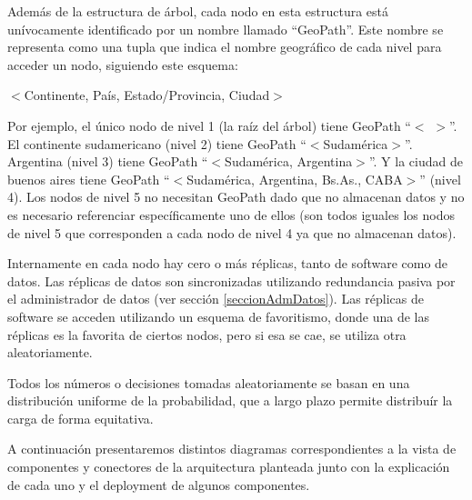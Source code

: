 Además de la estructura de árbol, cada nodo en esta estructura está unívocamente identificado por un nombre llamado ``GeoPath''. Este nombre se representa como una tupla que indica el nombre geográfico de cada nivel para acceder un nodo, siguiendo este esquema:
\begin{center}
	$<$Continente, País, Estado/Provincia, Ciudad$>$
\end{center}

Por ejemplo, el único nodo de nivel 1 (la raíz del árbol) tiene GeoPath ``$<$ $>$''. El continente sudamericano (nivel 2) tiene GeoPath ``$<$Sudamérica$>$''. Argentina (nivel 3) tiene GeoPath ``$<$Sudamérica, Argentina$>$''. Y la ciudad de buenos aires tiene GeoPath ``$<$Sudamérica, Argentina, Bs.As., CABA$>$'' (nivel 4). Los nodos de nivel 5 no necesitan GeoPath dado que no almacenan datos y no es necesario referenciar específicamente uno de ellos (son todos iguales los nodos de nivel 5 que corresponden a cada nodo de nivel 4 ya que no almacenan datos).

Internamente en cada nodo hay cero o más réplicas, tanto de software como de datos. Las réplicas de datos son sincronizadas utilizando redundancia pasiva por el administrador de datos (ver sección \ref{seccionAdmDatos}). Las réplicas de software se acceden utilizando un esquema de favoritismo, donde una de las réplicas es la favorita de ciertos nodos, pero si esa se cae, se utiliza otra aleatoriamente.

Todos los números o decisiones tomadas aleatoriamente se basan en una distribución uniforme de la probabilidad, que a largo plazo permite distribuír la carga de forma equitativa.


A continuación presentaremos distintos diagramas correspondientes a la vista de componentes y conectores de la arquitectura planteada junto con la explicación de cada uno y el deployment de algunos componentes.
